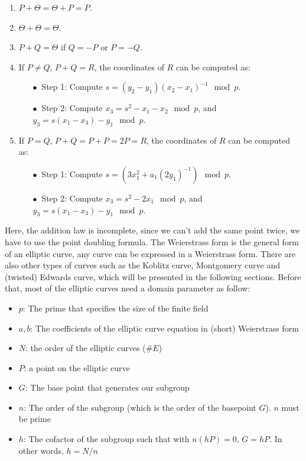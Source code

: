 \begin{enumerate}
  \item $P + \Theta = \Theta + P = P$.
  \item $\Theta + \Theta = \Theta$.
  \item $P + Q = \Theta$ if $Q = -P$ or $P = -Q$.
  \item If $P \neq Q$, $P + Q = R$, the coordinates of $R$ can be computed as:

        \begin{itemize}
        \addtolength{\itemindent}{1cm}
          \item[$\bullet \ $ Step 1:] Compute $s = (y_2 - y_1) (x_2 - x_1)^{-1} \mod p$.
          \item[$\bullet \ $ Step 2:] Compute $x_3 = s^2 - x_1 - x_2 \mod p$, and $y_3 = s(x_1 - x_3) - y_1 \mod p$.
        \end{itemize}

  \item If $P = Q$, $P + Q = P + P = 2P = R$, the coordinates of $R$ can be computed as:

        \begin{itemize}
        \addtolength{\itemindent}{1cm}
          \item[$\bullet \ $ Step 1:] Compute $s = (3x_1^2 + a_1 (2y_1)^{-1}) \mod p$.
          \item[$\bullet \ $ Step 2:] Compute $x_3 = s^2 - 2x_1 \mod p$, and $y_3 = s(x_1 - x_3) - y_1 \mod p$.
        \end{itemize}

\end{enumerate}

Here, the addition law is incomplete, since we can’t add the same point twice, we have to use the point doubling formula. The Weierstrass form is the general form of an elliptic curve, any curve can be expressed in a Weierstrass form. There are also other types of curves such as the Koblitz curve, Montgomery curve and (twisted) Edwards curve, which will be presented in the following sections. Before that, most of the elliptic curves need a domain parameter as follow:

\begin{itemize}
  \item$p$: The prime that specifies the size of the finite field
  \item$a, b$: The coefficients of the elliptic curve equation in (short) Weierstrass form
  \item$N$: the order of the elliptic curves ($\#E$)
  \item $P$: a point on the elliptic curve
        \item$G$: The base point that generates our subgroup
        \item$n$: The order of the subgroup (which is the order of the basepoint $G$). $n$ must be prime
        \item$h$: The cofactor of the subgroup such that with $n(hP)=0$, $G = hP$. In other words, $h=N/n$
\end{itemize}


